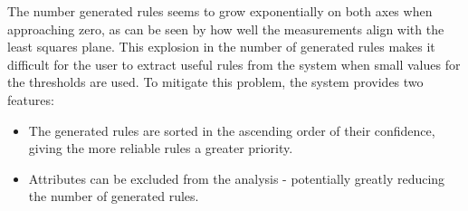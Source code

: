 The number generated rules seems to grow exponentially on both axes when approaching zero, as can be seen by how well the measurements align with the least squares plane. This explosion in the number of generated rules makes it difficult for the user to extract useful rules from the system when small values for the thresholds are used. To mitigate this problem, the system provides two features:

\begin{itemize}
	\item The generated rules are sorted in the ascending order of their confidence, giving the more reliable rules a greater priority.    
         
	\item Attributes can be excluded from the analysis - potentially greatly reducing the number of generated rules. 
\end{itemize}        

